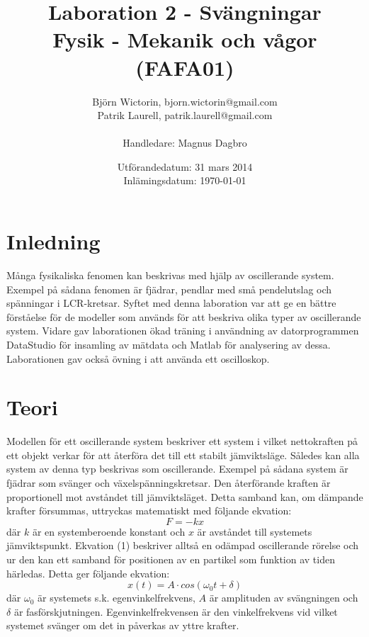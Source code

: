 \documentclass[a4paper,10pt]{article}
\title{Laboration 2 - Svängningar \\ Fysik - Mekanik och vågor (FAFA01)}
\author{Björn Wictorin, bjorn.wictorin@gmail.com \\ Patrik Laurell, patrik.laurell@gmail.com \\ \\ Handledare: Magnus Dagbro}
\date{Utförandedatum: 31 mars 2014 \\ Inlämingsdatum: \today}
\begin{document}
\maketitle
\thispagestyle{empty}
\newpage
{}
\tableofcontents{}
\pagebreak


\section{Inledning}
Många fysikaliska fenomen kan beskrivas med hjälp av oscillerande system. Exempel på sådana fenomen är fjädrar, pendlar med små pendelutslag och spänningar i LCR-kretsar. Syftet med denna laboration var att ge en bättre förståelse för de modeller som används för att beskriva olika typer av oscillerande system. Vidare gav laborationen ökad träning i användning av datorprogrammen DataStudio för insamling av mätdata och Matlab för analysering av dessa. Laborationen gav också övning i att använda ett oscilloskop.

\section{Teori}
Modellen för ett oscillerande system beskriver ett system i vilket nettokraften på ett objekt verkar för att återföra det till ett stabilt jämviktsläge. Således kan alla system av denna typ beskrivas som oscillerande. Exempel på sådana system är fjädrar som svänger och växelspänningskretsar. Den återförande kraften är proportionell mot avståndet till jämviktsläget. Detta samband kan, om dämpande krafter försummas, uttryckas matematiskt med följande ekvation:
\begin{equation}
	F = -kx
\end{equation}
där $k$ är en systemberoende konstant och $x$ är avståndet till systemets jämviktspunkt. Ekvation (1) beskriver alltså en odämpad oscillerande rörelse och ur den kan ett samband för positionen av en partikel som funktion av tiden härledas. Detta ger följande ekvation:
\begin{equation}
	x(t) = A \cdot cos(\omega_0t + \delta)
\end{equation}
där $\omega_0$ är systemets s.k. egenvinkelfrekvens, $A$ är amplituden av svängningen och $\delta$ är fasförskjutningen. Egenvinkelfrekvensen är den vinkelfrekvens vid vilket systemet svänger om det in påverkas av yttre krafter. \\
\end{document}
